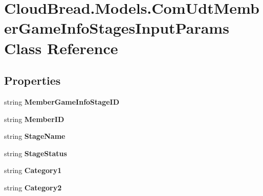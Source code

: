 \hypertarget{a00070}{}\section{Cloud\+Bread.\+Models.\+Com\+Udt\+Member\+Game\+Info\+Stages\+Input\+Params Class Reference}
\label{a00070}
\subsection*{Properties}
\begin{DoxyCompactItemize}
\item 
string {\bfseries Member\+Game\+Info\+Stage\+ID}\hypertarget{a00070_abd50fa73de804905a3f23b7dee14e4ab}{}\label{a00070_abd50fa73de804905a3f23b7dee14e4ab}

\item 
string {\bfseries Member\+ID}\hypertarget{a00070_af881bb332c421339bed0c3850b810778}{}\label{a00070_af881bb332c421339bed0c3850b810778}

\item 
string {\bfseries Stage\+Name}\hypertarget{a00070_a8a54fa9426f086b80662a97f882dbe86}{}\label{a00070_a8a54fa9426f086b80662a97f882dbe86}

\item 
string {\bfseries Stage\+Status}\hypertarget{a00070_ad3cca33d55f6ddee7149424816f7a241}{}\label{a00070_ad3cca33d55f6ddee7149424816f7a241}

\item 
string {\bfseries Category1}\hypertarget{a00070_adc6b3038ac33fed862d6fb03dd343912}{}\label{a00070_adc6b3038ac33fed862d6fb03dd343912}

\item 
string {\bfseries Category2}\hypertarget{a00070_a10514298a11b650371633a7e01e67ee5}{}\label{a00070_a10514298a11b650371633a7e01e67ee5}


\end{DoxyCompactItemize}
